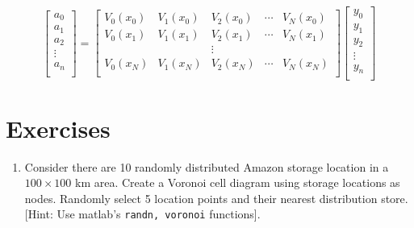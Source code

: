 \documentclass[11pt,titlepage,fleqn]{article}
\begin{document}
\begin{equation}
\begin{bmatrix}
a_0 \\
a_1 \\
a_2 \\
\vdots\\
a_n\\
\end{bmatrix} = 
\begin{bmatrix}
V_0(x_0) & V_1(x_0) &  V_2(x_0)  & \cdots & V_N(x_0)\\
V_0(x_1) & V_1(x_1) &  V_2(x_1)  & \cdots & V_N(x_1)\\
& & \vdots& &  \\
V_0(x_N) & V_1(x_N) &  V_2 (x_N) & \cdots & V_N(x_N)\\
\end{bmatrix}
\begin{bmatrix}
y_0 \\
y_1 \\
y_2 \\
\vdots\\
y_n\\
\end{bmatrix}
\end{equation}

\section{Exercises}
\begin{enumerate}
\item Consider there are 10 randomly distributed Amazon storage location in a $100 \times 100$ km area. Create a Voronoi cell diagram using storage locations as nodes. Randomly select 5 location points and their nearest distribution store. [Hint: Use matlab's \verb+randn, voronoi+ functions].
\end{enumerate}
\end{document}
